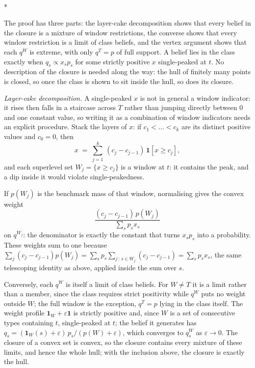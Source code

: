 \documentclass[12pt]{article}
\makeatletter
\theoremstyle{definition}
\renewenvironment{proof}[1][\proofname]{\par
  \pushQED{\qed}%
  \normalfont \topsep6\p@\@plus6\p@\relax
  \trivlist
  \item[\hskip\labelsep\itshape #1\@addpunct{.}]\mbox{}\\*
  \ignorespaces
}{%
  \popQED\endtrivlist\@endpefalse
}
\makeatother
\begin{document}
\begin{proof}[Proof of Lemma \ref{lem:windows}]
The proof has three parts: the layer-cake decomposition shows that every belief in the closure is a mixture of window restrictions, the converse shows that every window restriction is a limit of class beliefs, and the vertex argument shows that each $q^W$ is extreme, with only $q^T = p$ of full support. A belief lies in the class exactly when $q_s \propto x_s p_s$ for some strictly positive $x$ single-peaked at $t$. No description of the closure is needed along the way: the hull of finitely many points is closed, so once the class is shown to sit inside the hull, so does its closure.

\emph{Layer-cake decomposition.} A single-peaked $x$ is not in general a window indicator: it rises then falls in a staircase across $T$ rather than jumping directly between $0$ and one constant value, so writing it as a combination of window indicators needs an explicit procedure. Stack the layers of $x$: if $c_1 < \dots < c_k$ are its distinct positive values and $c_0 = 0$, then
\[
x \;=\; \sum_{j=1}^{k}\, (c_j - c_{j-1})\, \mathbf{1}[x \ge c_j],
\]
and each superlevel set $W_j = \{x \ge c_j\}$ is a window at $t$: it contains the peak, and a dip inside it would violate single-peakedness.

If $p(W_j)$ is the benchmark mass of that window, normalising gives the convex weight
\[
\frac{(c_j - c_{j-1})\, p(W_j)}{\sum_s p_s x_s}
\]
on $q^{W_j}$: the denominator is exactly the constant that turns $x_sp_s$ into a probability. These weights sum to one because $\sum_j (c_j-c_{j-1})p(W_j) = \sum_s p_s \sum_{j\,:\,s\in W_j}(c_j-c_{j-1}) = \sum_s p_s x_s$, the same telescoping identity as above, applied inside the sum over $s$.

Conversely, each $q^W$ is itself a limit of class beliefs. For $W \neq T$ it is a limit rather than a member, since the class requires strict positivity while $q^W$ puts no weight outside $W$; the full window is the exception, $q^T = p$ lying in the class itself. The weight profile $\mathbf{1}_W + \varepsilon \mathbf{1}$ is strictly positive and, since $W$ is a set of consecutive types containing $t$, single-peaked at $t$; the belief it generates has $q_s = (\mathbf{1}_W(s) + \varepsilon)\,p_s / (p(W) + \varepsilon)$, which converges to $q^W_s$ as $\varepsilon \to 0$. The closure of a convex set is convex, so the closure contains every mixture of these limits, and hence the whole hull; with the inclusion above, the closure is exactly the hull.


\end{proof}
\end{document}
